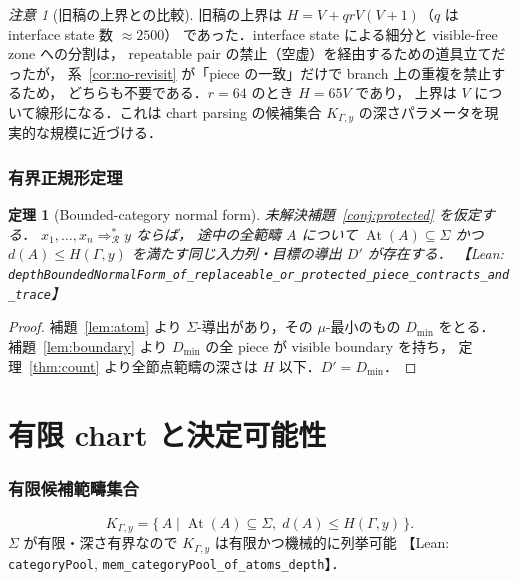 \documentclass[paper=a4,fontsize=10pt,jafontscale=0.92]{jlreq}
\theoremstyle{plain}
\newtheorem{theorem}{定理}
\theoremstyle{definition}
\theoremstyle{remark}
\newtheorem*{remark}{注意}
\newcommand{\R}{\mathcal{R}}
\newcommand{\Sig}{\Sigma}
\newcommand{\At}{\operatorname{At}}
\newcommand{\Dmin}{D_{\min}}
\newcommand{\lean}[1]{\texttt{#1}}
\begin{document}
\begin{remark}[旧稿の上界との比較]
旧稿の上界は $H = V + qrV(V+1)$（$q$ は interface state 数 $\approx 2500$）
であった．interface state による細分と visible-free zone への分割は，
repeatable pair の禁止（空虚）を経由するための道具立てだったが，
系~\ref{cor:no-revisit} が「piece の一致」だけで branch 上の重複を禁止するため，
どちらも不要である．$r = 64$ のとき $H = 65V$ であり，
上界は $V$ について線形になる．これは chart parsing の候補集合
$K_{\Gamma,y}$ の深さパラメータを現実的な規模に近づける．
\end{remark}

\section{有界正規形定理}

\begin{theorem}[Bounded-category normal form]
\label{thm:bounded}
未解決補題~\ref{conj:protected} を仮定する．
$x_1,\ldots,x_n\Rightarrow_{\R}^{*}y$ ならば，
途中の全範疇 $A$ について $\At(A)\subseteq\Sig$ かつ $d(A)\le H(\Gamma,y)$
を満たす同じ入力列・目標の導出 $D'$ が存在する．
【Lean: \lean{depthBoundedNormalForm\_of\_replaceable\_or\_protected\_piece\_contracts\_and\_trace}】
\end{theorem}

\begin{proof}
補題~\ref{lem:atom} より $\Sig$-導出があり，その $\mu$-最小のもの $\Dmin$ をとる．
補題~\ref{lem:boundary} より $\Dmin$ の全 piece が visible boundary を持ち，
定理~\ref{thm:count} より全節点範疇の深さは $H$ 以下．$D' = \Dmin$．
\end{proof}

\part{有限 chart と決定可能性}
\label{sec:chart}

\section{有限候補範疇集合}

\[
  K_{\Gamma,y} = \{\,A\mid \At(A)\subseteq\Sig,\;d(A)\le H(\Gamma,y)\,\}.
\]
$\Sig$ が有限・深さ有界なので $K_{\Gamma,y}$ は有限かつ機械的に列挙可能
【Lean: \lean{categoryPool}, \lean{mem\_categoryPool\_of\_atoms\_depth}】．
\end{document}
